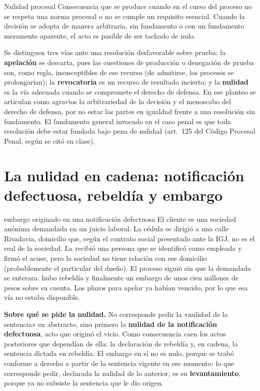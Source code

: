 \documentclass[12pt,oneside]{book}
\begin{document}
\begin{definicion}{Nulidad procesal}
Consecuencia que se produce cuando en el curso del proceso no se respeta una norma procesal o no se cumple un requisito esencial. Cuando la decisión se adopta de manera arbitraria, sin fundamento o con un fundamento meramente aparente, el acto es pasible de ser tachado de nulo.
\end{definicion}

Se distinguen tres vías ante una resolución desfavorable sobre prueba: la \textbf{apelación} se descarta, pues las cuestiones de producción o denegación de prueba son, como regla, insusceptibles de ese recurso (de admitirse, los procesos se prolongarían); la \textbf{revocatoria} es un recurso de resultado incierto; y la \textbf{nulidad} es la vía adecuada cuando se compromete el derecho de defensa. En ese planteo se articulan como agravios la arbitrariedad de la decisión y el menoscabo del derecho de defensa, por no estar las partes en igualdad frente a una resolución sin fundamento. El fundamento general invocado en el caso penal es que toda resolución debe estar fundada bajo pena de nulidad (art.~125 del Código Procesal Penal, según se citó en clase).

\section{La nulidad en cadena: notificación defectuosa, rebeldía y embargo}\label{sec:nulidad-cadena}

\begin{ejemplo}{embargo originado en una notificación defectuosa}
El cliente es una sociedad anónima demandada en un juicio laboral. La cédula se dirigió a una calle Rivadavia, domicilio que, según el contrato social presentado ante la IGJ, no es el real de la sociedad. La recibió una persona que se identificó como empleada y firmó el acuse, pero la sociedad no tiene relación con ese domicilio (probablemente el particular del dueño). El proceso siguió sin que la demandada se enterara: hubo rebeldía y finalmente un embargo de unos cien millones de pesos sobre su cuenta. Los plazos para apelar ya habían vencido, por lo que esa vía no estaba disponible.
\end{ejemplo}

\begin{importante}
\textbf{Sobre qué se pide la nulidad.} No corresponde pedir la «nulidad de la sentencia» en abstracto, sino primero la \textbf{nulidad de la notificación defectuosa}, acto que originó el vicio. Como consecuencia caen los actos posteriores que dependían de ella: la declaración de rebeldía y, en cadena, la sentencia dictada en rebeldía. El embargo en sí no es nulo, porque se trabó conforme a derecho a partir de la sentencia vigente en ese momento: lo que corresponde pedir, declarada la nulidad de lo anterior, es su \textbf{levantamiento}, porque ya no subsiste la sentencia que le dio origen.
\end{importante}
\end{document}
